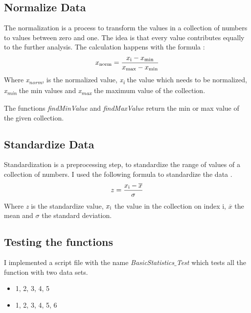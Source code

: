 \documentclass[10pt, a4paper, twocolumn]{article} %
\begin{document}
\subsection{Normalize Data}
The normalization is a process to transform the values in a collection of numbers to values between zero and one. The idea is that every value contributes equally to the further analysis. The calculation happens with the formula \citep{normalizeDataStatology}: 
\[
x\textsubscript{norm} = \frac{x\textsubscript{i} - x\textsubscript{min}} {x\textsubscript{max} - x\textsubscript{min}}
\]
Where \textit{x\textsubscript{norm}}, is the normalized value, \textit{x\textsubscript{i}} the value which needs to be normalized, \textit{x\textsubscript{min}} the min values and \textit{x\textsubscript{max}} the maximum value of the collection. 

The functions \textit{findMinValue} and \textit{findMaxValue} return the min or max value of the given collection. 

\subsection{Standardize Data}
Standardization is a preprocessing step, to standardize the range of values of a collection of numbers. I used the following formula to standardize the data
\citep{standardizeDataBuildIn}. 
\[
z = \frac{x\textsubscript{i} - \overline{x}}{\sigma}
\]
Where \textit{z} is the standardize value, \textit{$x\textsubscript{i}$} the value in the collection on index i, \textit{$\overline{x}$} the mean and \textit{$\sigma$} the standard deviation.

\subsection{Testing the functions}
I implemented a script file with the name \textit{BasicStatistics$\_$Test} which tests all the function with two data sets. 

\begin{itemize}
	\item 1, 2, 3, 4, 5
	\item 1, 2, 3, 4, 5, 6
\end{itemize}
                                                                                                                                                                                                                                                              
\end{document}
